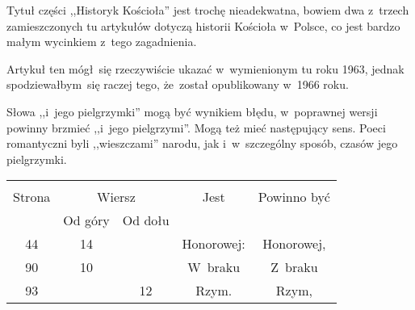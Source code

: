\documentclass[a4paper,11pt]{article}
\begin{document}

\start {} Tytuł części ,,Historyk Kościoła'' jest trochę
nieadekwatna, bowiem dwa z~trzech zamieszczonych tu artykułów dotyczą
historii Kościoła w~Polsce, co jest bardzo małym wycinkiem z~tego
zagadnienia.

\vspace{\spaceFour}


\start {} Artykuł ten mógł~się rzeczywiście ukazać
w~wymienionym tu roku 1963, jednak spodziewałbym~się raczej tego,
że~został opublikowany w~1966 roku.

\vspace{\spaceFour}


\start {} Słowa ,,i~jego pielgrzymki'' mogą być wynikiem
błędu, w~poprawnej wersji powinny brzmieć ,,i~jego pielgrzymi''. Mogą
też mieć następujący sens. Poeci romantyczni byli ,,wieszczami''
narodu, jak i~w~szczególny sposób, czasów jego pielgrzymki.

\begin{center}
  \begin{tabular}{|c|c|c|c|c|}
    \hline
    & \multicolumn{2}{c|}{} & & \\
    Strona & \multicolumn{2}{c|}{Wiersz} & Jest
                              & Powinno być \\ \cline{2-3}
    & Od góry & Od dołu & & \\
    \hline
    44  & 14 & & Honorowej: & Honorowej, \\
    90  & 10 & & W~braku & Z~braku \\
    93  & & 12 & Rzym. & Rzym, \\
    \hline
  \end{tabular}
\end{center}



 {}




\end{document}
